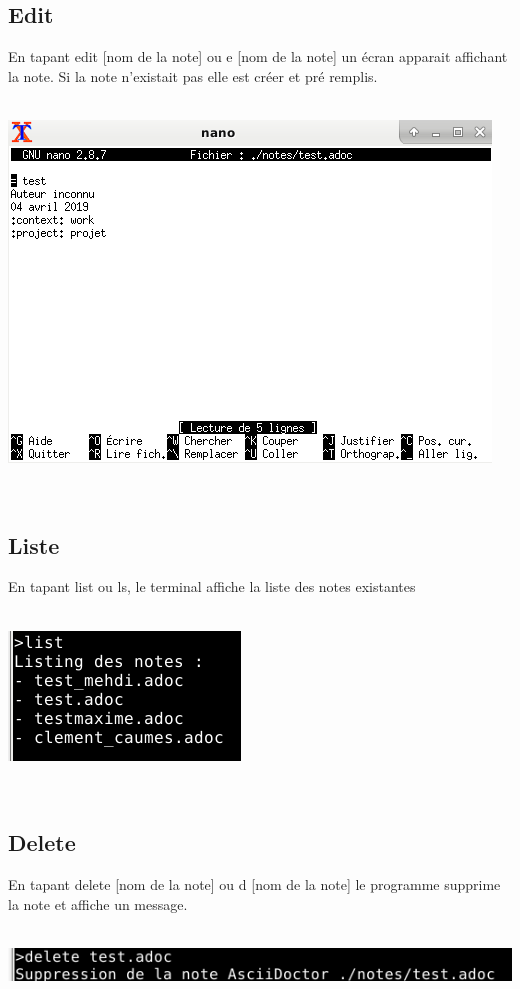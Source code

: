 \documentclass[a4paper,11pt]{article}
\begin{document}
		\subsection{Edit}
			En tapant edit [nom de la note] ou e [nom de la note] un écran apparait affichant la note.
			Si la note n'existait pas elle est créer et pré remplis.\\
			\\
			\centerline{\includegraphics[scale=0.9]{Captures/edit.png}}
			\\
		\subsection{Liste}
			En tapant list ou ls, le terminal affiche la liste des notes existantes\\
			\\
			\centerline{\includegraphics[scale=0.9]{Captures/list.png}}
			\\
		\subsection{Delete}
			En tapant delete [nom de la note] ou d [nom de la note] le programme supprime la note et affiche un message.\\
			\\
			\centerline{\includegraphics[scale=0.9]{Captures/delete.png}}
			\\
\end{document}
